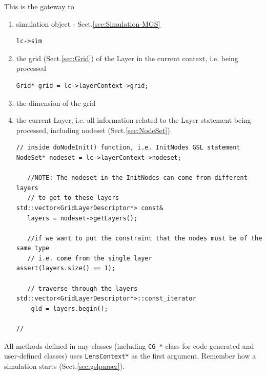 This is the gateway to 
\begin{enumerate}
  \item simulation object - Sect.\ref{sec:Simulation-MGS}
  
\begin{verbatim}
lc->sim
\end{verbatim}  
  
  \item the grid (Sect.\ref{sec:Grid}) of the Layer in the current context, i.e.
  being processed
  
\begin{verbatim}
Grid* grid = lc->layerContext->grid;
\end{verbatim}

  \item the dimension of the grid

  \item the current Layer, i.e. all information related to the Layer
  statement being processed, including nodeset (Sect.\ref{sec:NodeSet}).

\begin{verbatim}
// inside doNodeInit() function, i.e. InitNodes GSL statement
NodeSet* nodeset = lc->layerContext->nodeset;

   //NOTE: The nodeset in the InitNodes can come from different layers
   // to get to these layers
std::vector<GridLayerDescriptor*> const& 
   layers = nodeset->getLayers();
   
   //if we want to put the constraint that the nodes must be of the same type
   // i.e. come from the single layer
assert(layers.size() == 1);

   // traverse through the layers
std::vector<GridLayerDescriptor*>::const_iterator 
    gld = layers.begin(); 

//
\end{verbatim}  

  
  
\end{enumerate}
All methods defined in any classes (including \verb!CG_*! class for
code-generated and user-defined classes) uses \verb!LensContext*! as the first
argument. Remember how a simulation starts (Sect.\ref{sec:gslparser}).

